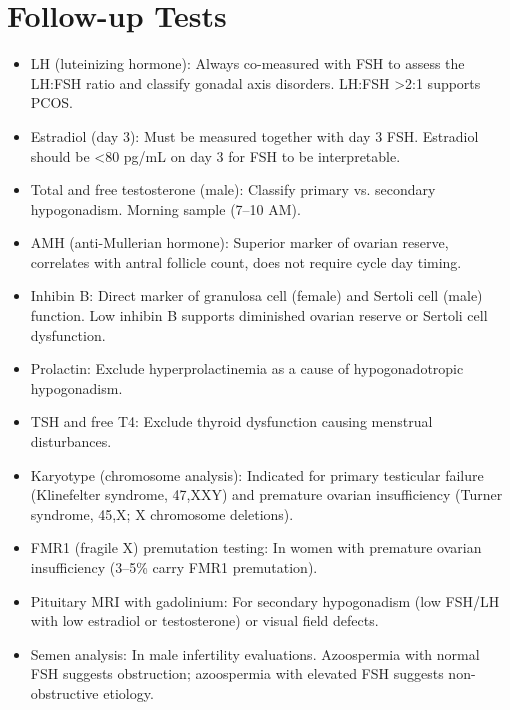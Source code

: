 \section*{Follow-up Tests}
\begin{itemize}
  \item LH (luteinizing hormone): Always co-measured with FSH to assess the LH:FSH ratio and classify gonadal axis disorders. LH:FSH >2:1 supports PCOS.
  \item Estradiol (day 3): Must be measured together with day 3 FSH. Estradiol should be <80 pg/mL on day 3 for FSH to be interpretable.
  \item Total and free testosterone (male): Classify primary vs. secondary hypogonadism. Morning sample (7--10 AM).
  \item AMH (anti-Mullerian hormone): Superior marker of ovarian reserve, correlates with antral follicle count, does not require cycle day timing.
  \item Inhibin B: Direct marker of granulosa cell (female) and Sertoli cell (male) function. Low inhibin B supports diminished ovarian reserve or Sertoli cell dysfunction.
  \item Prolactin: Exclude hyperprolactinemia as a cause of hypogonadotropic hypogonadism.
  \item TSH and free T4: Exclude thyroid dysfunction causing menstrual disturbances.
  \item Karyotype (chromosome analysis): Indicated for primary testicular failure (Klinefelter syndrome, 47,XXY) and premature ovarian insufficiency (Turner syndrome, 45,X; X chromosome deletions).
  \item FMR1 (fragile X) premutation testing: In women with premature ovarian insufficiency (3--5\% carry FMR1 premutation).
  \item Pituitary MRI with gadolinium: For secondary hypogonadism (low FSH/LH with low estradiol or testosterone) or visual field defects.
  \item Semen analysis: In male infertility evaluations. Azoospermia with normal FSH suggests obstruction; azoospermia with elevated FSH suggests non-obstructive etiology.
\end{itemize}

